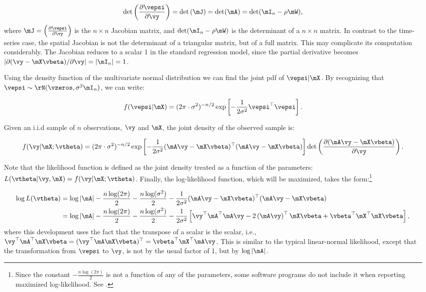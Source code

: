 \documentclass[english,12pt]{book}\usepackage[]{graphicx}\usepackage[]{xcolor}
\begin{document}
\begin{equation*}
\det\left(\frac{\partial \vepsi}{\partial \vy}\right)= \det\left(\mJ\right)=\det(\mA)=\det(\mI_n - \rho\mW),
\end{equation*}
%
where $\mJ = \left(\frac{\partial \vepsi}{\partial \vy}\right)$ is the $n\times n$ Jacobian matrix, and $\det(\mI_n - \rho\mW)$ is the determinant of a $ n \times n$ matrix. In contrast to the time-series case, the spatial Jacobian is not the determinant of a triangular matrix, but of a full matrix. This may complicate its computation considerably. The Jacobian reduces to a scalar 1 in the standard regression model, since the partial derivative becomes $\left|\partial (\vy - \mX\vbeta)/ \partial \vy\right| = \left|\mI_n\right| = 1$. 

Using the density function of the multivariate normal distribution we can find the joint pdf of $\vepsi|\mX$. By recognizing that $\vepsi \sim \rN(\vzeros, \sigma^2\mI_n)$, we can write: 

\begin{equation*}
	f(\vepsi | \mX) = (2\pi \cdot\sigma^2)^{-n/2}\exp\left[-\frac{1}{2\sigma^2}\vepsi^\top\vepsi\right].
\end{equation*}

Given an i.i.d sample of $n$ observations, $\vy$ and $\mX$, the joint density of the observed sample is:

\begin{equation*}
	f(\vy|\mX;\vtheta) = (2\pi \cdot\sigma^2)^{-n/2}\exp\left[-\frac{1}{2\sigma^2}(\mA\vy-\mX\vbeta)^\top (\mA\vy-\mX\vbeta)\right]\det\left(\frac{\partial (\mA\vy - \mX\vbeta)}{\partial \vy}\right).
	\end{equation*}
	
Note that the likelihood function is defined as the joint density treated as a function of the parameters: $L(\vtheta|\vy, \mX) = f(\vy|\mX;\vtheta)$. Finally, the log-likelihood function, which will be maximized, takes the form:\footnote{Since the constant $- \frac{n\log(2\pi)}{2}$ is not a function of any of the parameters, some software programs do not include it when reporting maximized log-likelihood. See \cite{spdep}.}

\begin{equation} \label{eq:LL_SLM_2}
  \begin{aligned}
\log L(\vtheta) &= \log\left| \mA\right| - \frac{n\log(2\pi)}{2} - \frac{n\log(\sigma^2)}{2} - \frac{1}{2\sigma^2}(\mA\vy-\mX\vbeta)^\top (\mA\vy-\mX\vbeta) \\
&= \log\left| \mA\right| - \frac{n\log(2\pi)}{2} - \frac{n\log(\sigma^2)}{2} - \frac{1}{2\sigma^2}\left[\vy^\top \mA^\top\mA\vy - 2\left(\mA\vy\right)^\top\mX\vbeta + \vbeta^\top\mX^\top\mX\vbeta\right],
\end{aligned}
\end{equation}	
%	
where this development uses the fact that the transpose of a scalar is the scalar, i.e., 	$\vy^\top\mA^\top\mX\vbeta = (\vy^\top\mA\mX\vbeta)^\top = \vbeta^\top\mX^\top\mA\vy$. This is similar to the typical linear-normal likelihood, except that the transformation from $\vepsi$ to $\vy$, is not by the usual factor of 1, but by $\log\left| \mA\right|$.
\end{document}
